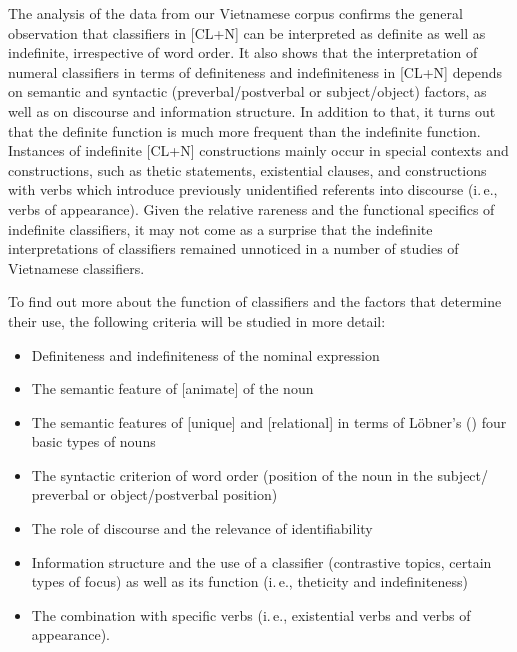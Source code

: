 \documentclass[output=paper]{langsci/langscibook}
\begin{document}
{
The analysis of the data from our Vietnamese corpus confirms the general observation that classifiers in [CL+N] can be interpreted as definite as well as indefinite, irrespective of word order. It also shows that the interpretation of numeral classifiers in terms of definiteness and indefiniteness in [CL+N] depends on semantic and syntactic (preverbal/postverbal or subject/object) factors, as well as on discourse and information structure. In addition to that, it turns out that the definite function is much more frequent than the indefinite function. Instances of indefinite [CL+N] constructions mainly occur in special contexts and constructions, such as thetic statements, existential clauses, and constructions with verbs which introduce previously unidentified referents into discourse (i.\,e., verbs of appearance). Given the relative rareness and the functional specifics of indefinite classifiers, it may not come as a surprise that the indefinite interpretations of classifiers remained unnoticed in a number of studies of Vietnamese classifiers.
}

To find out more about the function of classifiers and the factors that determine their use, the following criteria will be studied in more detail:

\begin{itemize}
\setlength\itemsep{-0.1em}
\item Definiteness and indefiniteness of the nominal expression
\item The semantic feature of [\pm animate] of the noun
\item The semantic features of [\pm unique] and [\pm relational] in terms of L\"obner's (\citeyear{lobner:85,lobner:11}) four basic types of nouns
\item The syntactic criterion of word order (position of the noun in the subject/ preverbal or object/postverbal position)
\item The role of discourse and the relevance of identifiability
\item Information structure and the use of a classifier (contrastive topics, certain types of focus) as well as its function (i.\,e., theticity and indefiniteness)
\item The combination with specific verbs (i.\,e., existential verbs and verbs of appearance).
\end{itemize}
\end{document}
